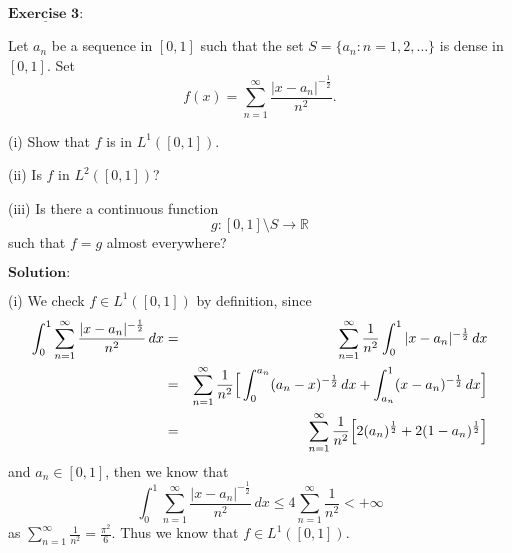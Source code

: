 \documentclass[12pt,a4paper]{ctexart}
\begin{document}
\newpage

$\underline{\textbf{Exercise 3:}}$

Let $a_{n}$ be a sequence in $[0, 1]$ such that the set $S = \{a_{n}: n = 1, 2, \dots \}$ is dense in $[0, 1]$. Set
\begin{equation*}
   f(x) = \sum_{n = 1}^{\infty} \frac{|x - a_{n}|^{- \frac{1}{2}}}{n^{2}}.
\end{equation*}

(i) Show that $f$ is in $L^{1}([0, 1])$.

(ii) Is $f$ in $L^{2} ([0, 1])$?

(iii) Is there a continuous function
\begin{equation*}
   g : [0, 1] \setminus S \rightarrow \mathbb{R}
\end{equation*}
such that $f = g$ almost everywhere?

\vspace{8pt}
$\textbf{Solution:}$

(i) We check $f \in L^{1}([0,1])$ by definition, since
\begin{eqnarray*}
\int_{0}^{1} \sum_{n = 1}^{\infty} \frac{|x - a_{n}|^{- \frac{1}{2}}}{n^{2}} \, d x  & = & \sum_{n = 1}^{\infty} \frac{1}{n^{2}} \int_{0}^{1} |x - a_{n}|^{- \frac{1}{2}} \, d x \\
& = & \sum_{n = 1}^{\infty} \frac{1}{n^{2}} \Big{[}  \int_{0}^{a_{n}} (a_{n} - x)^{- \frac{1}{2}} \, d x + \int_{a_{n}}^{1} (x - a_{n})^{- \frac{1}{2}} \, d x  \Big{]} \\
& = & \sum_{n = 1}^{\infty} \frac{1}{n^{2}} \Big{[} 2 (a_{n})^{\frac{1}{2}} + 2 (1 - a_{n})^{\frac{1}{2}}  \Big{]}
\end{eqnarray*}
and $a_{n} \in [0, 1]$, then we know that
\begin{equation*}
   \int_{0}^{1} \sum_{n = 1}^{\infty} \frac{|x - a_{n}|^{- \frac{1}{2}}}{n^{2}} \, d x \leq 4 \sum_{n = 1}^{\infty} \frac{1}{n^{2}} < + \infty
\end{equation*}
as $\sum_{n = 1}^{\infty} \frac{1}{n^{2}} = \frac{\pi^{2}}{6}$. Thus we know that $f \in L^{1}([0,1])$.
\end{document}
